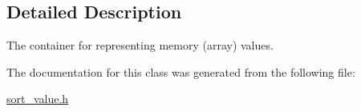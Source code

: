 \subsection{Detailed Description}
The container for representing memory (array) values. 

The documentation for this class was generated from the following file\+:\begin{DoxyCompactItemize}
\item 
\mbox{\hyperlink{sort__value_8h}{sort\+\_\+value.\+h}}\end{DoxyCompactItemize}
